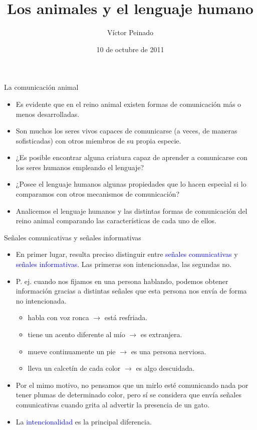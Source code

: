 \documentclass[handout]{beamer}
\title[Comunicación]{Los animales y el lenguaje humano}
\author[V. Peinado]{Víctor Peinado}
\institute[UCM]{
  \texttt{v.peinado@filol.ucm.es}\\[1ex]
  
  Grado de Logopedia, Universidad Complutense de Madrid\\[1ex]
}
\date[3 oct 2011]{10 de octubre de 2011}
\begin{document}
\let\it\textit
\let\ipa\textipa

\begin{frame}[plain]
  \titlepage
\end{frame}



\begin{frame}{La comunicación animal}

\begin{itemize}
	\item Es evidente que en el reino animal existen formas de comunicación más o menos desarrolladas.
	\item Son muchos los seres vivos capaces de comunicarse (a veces, de maneras sofisticadas) con otros miembros de su propia especie.
	\item ¿Es posible encontrar alguna criatura capaz de aprender a comunicarse con los seres humanos empleando el lenguaje?
	\item ¿Posee el lenguaje humanos algunas propiedades que lo hacen especial si lo comparamos con otros mecanismos de comunicación? 
	\item Analicemos el lenguaje humanos y las distintas formas de comunicación del reino animal comparando las características de cada uno de ellos.
\end{itemize}

\end{frame}

\begin{frame}{Señales comunicativas y señales informativas}

\begin{itemize}
	\item En primer lugar, resulta preciso distinguir entre \textcolor{blue}{señales comunicativas} y \textcolor{blue}{señales informativas}. Las primeras son intencionadas, las segundas no.
	
	\item P. ej. cuando nos fijamos en una persona hablando, podemos obtener información gracias a distintas señales que esta persona nos envía de forma no intencionada.
	\begin{itemize}
		\item habla con voz ronca $\rightarrow$ está resfriada.
		\item tiene un acento diferente al mío $\rightarrow$ es extranjera.
		\item mueve continuamente un pie $\rightarrow$ es una persona nerviosa.
		\item lleva un calcetín de cada color $\rightarrow$ es algo descuidada.
	\end{itemize}
	\item Por el mimo motivo, no pensamos que un mirlo esté comunicando nada por tener plumas de determinado color, pero sí se considera que envía señales comunicativas cuando grita al advertir la presencia de un gato.
	\item La \textcolor{blue}{intencionalidad} es la principal diferencia.
\end{itemize}

\end{frame}
\end{document}
